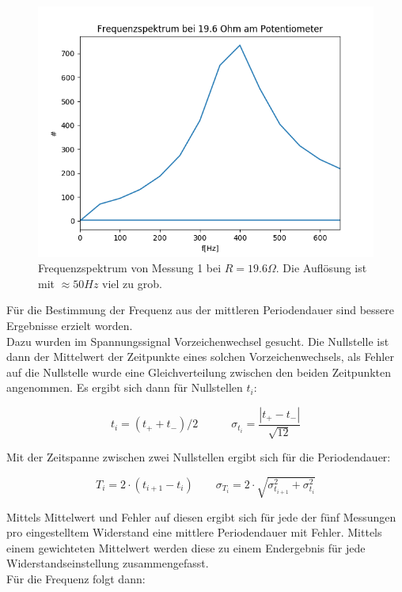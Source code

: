 \documentclass[12pt,a4paper]{article}
\begin{document}
\begin{figure}
\begin{center}
\includegraphics[scale=0.75]{Bilder/fft_19,6Ohm}
\end{center}
\caption{Frequenzspektrum von Messung 1 bei $R=19.6 \Omega$. Die Auflösung ist mit $\approx 50Hz$ viel zu grob.}
\label{fig:Fourier19,6}
\end{figure}

Für die Bestimmung der Frequenz aus der mittleren Periodendauer sind bessere Ergebnisse erzielt worden.\\
Dazu wurden im Spannungssignal Vorzeichenwechsel gesucht. Die Nullstelle ist dann der Mittelwert der Zeitpunkte eines solchen Vorzeichenwechsels, als Fehler auf die Nullstelle wurde eine Gleichverteilung zwischen den beiden Zeitpunkten angenommen. Es ergibt sich dann für Nullstellen $t_i$:

\begin{equation}
t_i=(t_++t_-)/2 \quad \quad \quad
\sigma_{t_i}=\frac{|t_+-t_-|}{\sqrt{12}}
\end{equation}

Mit der Zeitspanne zwischen zwei Nullstellen ergibt sich für die Periodendauer:

\begin{equation}
T_i=2\cdot (t_{i+1}-t_i) \quad \quad
\sigma_{T_i}=2\cdot \sqrt{\sigma_{t_{i+1}}^2+\sigma_{t_i}^2}
\end{equation}

Mittels Mittelwert und Fehler auf diesen ergibt sich für jede der fünf Messungen pro eingestelltem Widerstand eine mittlere Periodendauer mit Fehler. Mittels einem gewichteten Mittelwert werden diese zu einem Endergebnis für jede Widerstandseinstellung zusammengefasst.\\
Für die Frequenz folgt dann:
\end{document}
